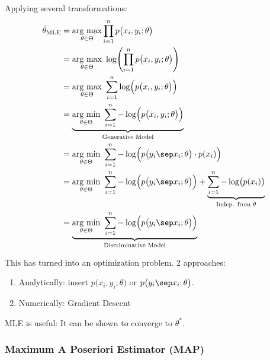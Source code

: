 Applying several transformations:
{\footnotesize
\begin{align*}
        \hat{\theta}_\text{MLE} &= \underset{\theta\in\Theta}{\text{arg max}}\prod_{i=1}^n p\bigl( x_i,y_i;\theta \bigr)                                                                        \\
                                &= \underset{\theta\in\Theta}{\text{arg max}}\ \log \Biggl( \prod_{i=1}^n p\bigl( x_i,y_i;\theta \bigr) \Biggr)                                                 \\
                                &= \underset{\theta\in\Theta}{\text{arg max}}\ \sum_{i=1}^n \log \Bigl( p\bigl( x_i,y_i;\theta \bigr) \Bigr)                                                    \\
                                &= \underbrace{\underset{\theta\in\Theta}{\text{arg min}}\ \sum_{i=1}^n -\log \Bigl( p\bigl( x_i,y_i;\theta \bigr) \Bigr)}_\text{Generative Model}              \\
                                &= \underset{\theta\in\Theta}{\text{arg min}}\ \sum_{i=1}^n -\log \Bigl( p\bigl( y_i \sep x_i ; \theta \bigr)\cdot p(x_i) \Bigr)                                \\
                                &= \underset{\theta\in\Theta}{\text{arg min}}\ \sum_{i=1}^n -\log \Bigl( p\bigl( y_i \sep x_i ; \theta \bigr) \Bigr) + \underbrace{\sum_{i=1}^n - \log\bigl(p(x_i)\bigr)}_\text{Indep. from $\theta$}    \\
                                &= \underbrace{\underset{\theta\in\Theta}{\text{arg min}}\ \sum_{i=1}^n -\log \Bigl( p\bigl( y_i \sep x_i ; \theta \bigr) \Bigr)}_\text{Discriminative Model}
\end{align*}        
}

This has turned into an optimization problem. 2 approaches:
\begin{enumerate}
    \item Analytically: insert $p\bigl( x_i,y_i ; \theta \bigr)$ or $p\bigl( y_i \sep x_i ; \theta \bigr)$.\\
    \item Numerically: Gradient Descent
\end{enumerate}

\remark MLE is useful: It can be shown to converge to $\theta^*$.

\newpage

\subsubsection{Maximum A Poseriori Estimator (MAP)}

